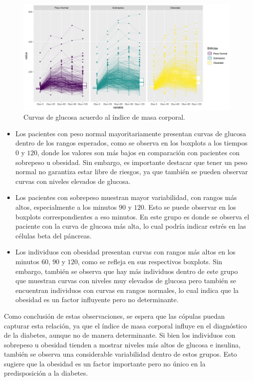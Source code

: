 \begin{figure}[H]
    \centering
    \includegraphics[width = 0.98 \textwidth]{Imagenes/gluCurvasBMI.png}
    \caption{Curvas de glucosa acuerdo al índice de masa corporal.}
    \label{fig:CurvasGluIBM}
\end{figure}

\begin{itemize}
    \item Los pacientes con peso normal mayoritariamente presentan curvas de glucosa dentro de los rangos esperados, como se observa en los boxplots a los tiempos $0$ y $120$, donde los valores son más bajos en comparación con pacientes con sobrepeso u obesidad. Sin embargo, es importante destacar que tener un peso normal no garantiza estar libre de riesgos, ya que también se pueden observar curvas con niveles elevados de glucosa.

    \item Los pacientes con sobrepeso muestran mayor variabilidad, con rangos más altos, especialmente a los minutos $90$ y $120$. Esto se puede observar en los boxplots correspondientes a eso minutos. En este grupo es donde se observa el paciente con la curva de glucosa más alta, lo cual podría indicar estrés en las células beta del páncreas.

    \item Los individuos con obesidad presentan curvas con rangos más altos en los minutos $60$, $90$ y $120$, como se refleja en sus respectivos boxplots.  Sin embargo, también se observa que hay más individuos dentro de este grupo que muestran curvas con niveles muy elevados de glucosa pero también se encuentran individuos con curvas en rangos normales, lo cual indica que la obesidad es un factor influyente pero no determinante.
\end{itemize}

Como conclusión de estas observaciones, se espera que las cópulas puedan capturar esta relación, ya que el índice de masa corporal influye en el diagnóstico de la diabetes, aunque no de manera determinante. Si bien los individuos con sobrepeso u obesidad tienden a mostrar niveles más altos de glucosa e insulina, también se observa una considerable variabilidad dentro de estos grupos. Esto sugiere que la obesidad es un factor importante pero no único en la predisposición a la diabetes.


